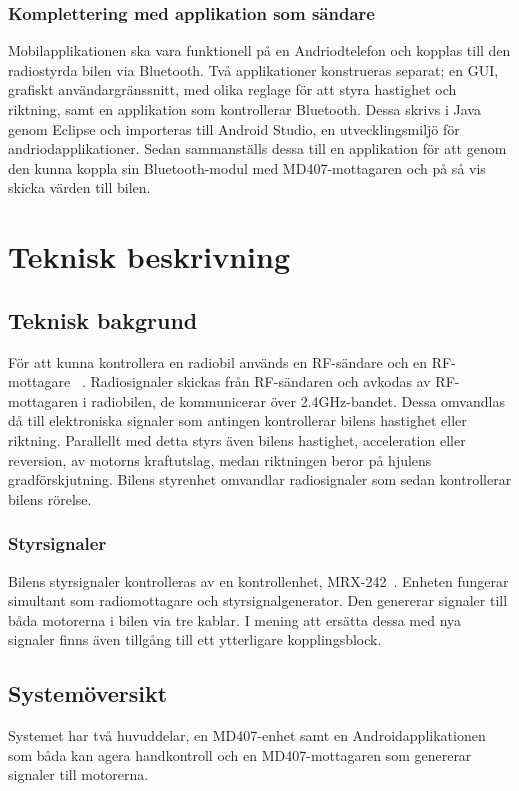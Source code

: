 \documentclass[a4paper]{article}
\begin{document}
\subsubsection{Komplettering med applikation som sändare}
\vspace{5mm} \noindent
Mobilapplikationen ska vara funktionell på en Andriodtelefon och kopplas till den radiostyrda bilen via Bluetooth. Två applikationer konstrueras separat; en GUI, grafiskt användargränssnitt, med olika reglage för att styra hastighet och riktning, samt en applikation som kontrollerar Bluetooth. Dessa skrivs i Java genom Eclipse och importeras till Android Studio, en utvecklingsmiljö för andriodapplikationer. Sedan sammanställs dessa till en applikation för att genom den kunna koppla sin Bluetooth-modul med MD407-mottagaren och på så vis skicka värden till bilen.

\newpage
\section{Teknisk beskrivning}

\subsection{Teknisk bakgrund}
För att kunna kontrollera en radiobil används en RF-sändare och en RF-mottagare ~\cite{RCTechnique}. Radiosignaler skickas från RF-sändaren och avkodas av RF-mottagaren i radiobilen, de kommunicerar över 2.4GHz-bandet. Dessa omvandlas då till elektroniska signaler som antingen kontrollerar bilens hastighet eller riktning. Parallellt med detta styrs även bilens hastighet, acceleration eller reversion, av motorns kraftutslag, medan riktningen beror på hjulens gradförskjutning. Bilens styrenhet omvandlar radiosignaler som sedan kontrollerar bilens rörelse.

\subsubsection{Styrsignaler}
Bilens styrsignaler kontrolleras av en kontrollenhet, MRX-242~\cite{projektDir}. Enheten fungerar simultant som radiomottagare och styrsignalgenerator. Den genererar signaler till båda motorerna i bilen via tre kablar. I mening att ersätta dessa med nya signaler finns även tillgång till ett ytterligare kopplingsblock.


\subsection{Systemöversikt}
Systemet har två huvuddelar, en MD407-enhet samt en Androidapplikationen som båda kan agera handkontroll och en MD407-mottagaren som genererar signaler till motorerna.
\end{document}
